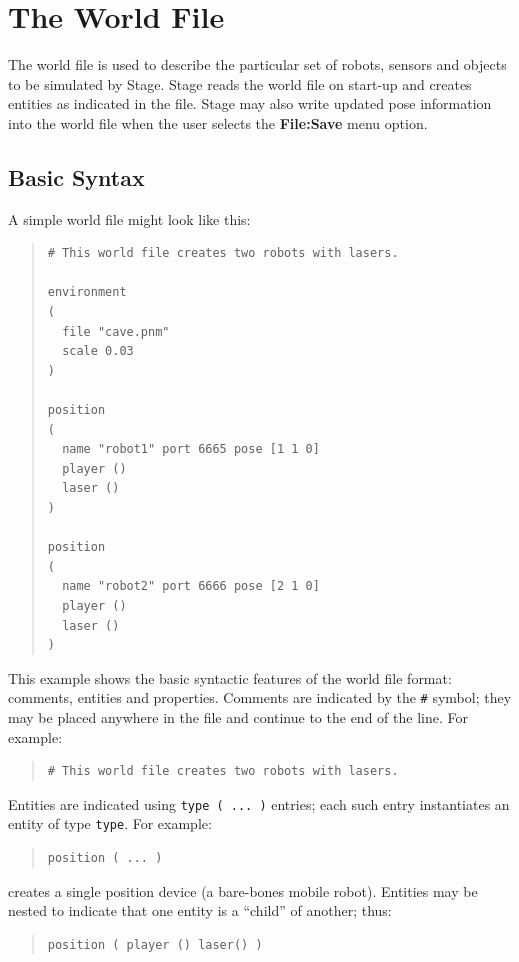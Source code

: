 \documentclass[11pt]{report}
\begin{document}
\chapter{The World File}

The world file is used to describe the particular set of robots,
sensors and objects to be simulated by Stage.  Stage reads the world
file on start-up and creates entities as indicated in the file.  Stage
may also write updated pose information into the world file when the
user selects the {\bf File:Save} menu option.

\section{Basic Syntax}

A simple world file might look like this:
\begin{quote}
\begin{verbatim}
# This world file creates two robots with lasers.

environment 
( 
  file "cave.pnm" 
  scale 0.03 
)

position 
( 
  name "robot1" port 6665 pose [1 1 0] 
  player ()
  laser ()
)

position 
( 
  name "robot2" port 6666 pose [2 1 0] 
  player ()
  laser ()
)
\end{verbatim}
\end{quote}
This example shows the basic syntactic features of the 
world file format: comments, entities and properties.
%
Comments are indicated by the \verb'#' symbol; they may be placed
anywhere in the file and continue to the end of the line.  For
example:
\begin{quote}
\begin{verbatim}
# This world file creates two robots with lasers.
\end{verbatim}
\end{quote}
%
Entities are indicated using \verb'type ( ... )' entries; each such
entry instantiates an entity of type \verb'type'.  For example:
\begin{quote}
\begin{verbatim}
position ( ... )
\end{verbatim}
\end{quote}
creates a single position device (a bare-bones mobile robot).  Entities may
be nested to indicate that one entity is a ``child'' of another; thus:
\begin{quote}
\begin{verbatim}
position ( player () laser() )
\end{verbatim}
\end{quote}
\end{document}
